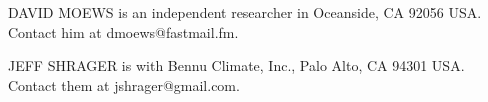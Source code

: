 \documentclass{IEEEcsmag}
\begin{document}
%
% 


\begin{IEEEbiography}{\color{darkblue} DAVID MOEWS} is an independent researcher in Oceanside, CA 92056 USA.  Contact him at dmoews@fastmail.fm.
\end{IEEEbiography}

\begin{IEEEbiography}{\color{darkblue} JEFF SHRAGER} is with Bennu Climate, Inc., Palo Alto, CA 94301 USA.  Contact them at jshrager@gmail.com.
\end{IEEEbiography}
\end{document}
